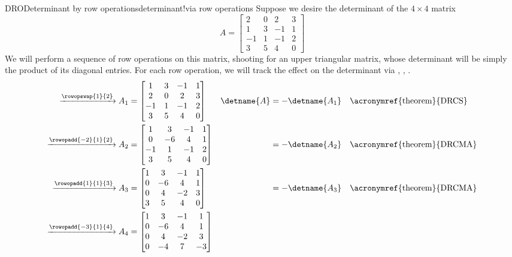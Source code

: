 \begin{example}{DRO}{Determinant by row operations}{determinant!via row operations}
Suppose we desire the determinant of the $4\times 4$ matrix
%
\begin{equation*}
A=
\begin{bmatrix}
2 & 0 & 2 & 3 \\
1 & 3 &-1 & 1 \\
-1& 1 &-1 & 2 \\
3 & 5 & 4 & 0 
\end{bmatrix}
\end{equation*}
%
We will perform a sequence of row operations on this matrix, shooting for an upper triangular matrix, whose determinant will be simply the product of its diagonal entries.  For each row operation, we will track the effect on the determinant via , , .
%
\begin{align*}
\xrightarrow{\rowopswap{1}{2}}
A_1&=
\begin{bmatrix}
1 & 3 &-1 & 1 \\
2 & 0 & 2 & 3 \\
-1& 1 &-1 & 2 \\
3 & 5 & 4 & 0 
\end{bmatrix}
&
\detname{A}&=-\detname{A_1}&&\text{\acronymref{theorem}{DRCS}}\\
\xrightarrow{\rowopadd{-2}{1}{2}}
A_2&=
\begin{bmatrix}
1 & 3 &-1 & 1 \\
0 &-6 & 4 & 1 \\
-1& 1 &-1 & 2 \\
3 & 5 & 4 & 0 
\end{bmatrix}
&
&=-\detname{A_2}&&\text{\acronymref{theorem}{DRCMA}}\\
\xrightarrow{\rowopadd{1}{1}{3}}
A_3&=
\begin{bmatrix}
1 & 3 &-1 & 1 \\
0 &-6 & 4 & 1 \\
0 & 4 &-2 & 3 \\
3 & 5 & 4 & 0 
\end{bmatrix}
&
&=-\detname{A_3}&&\text{\acronymref{theorem}{DRCMA}}\\
\xrightarrow{\rowopadd{-3}{1}{4}}
A_4&=
\begin{bmatrix}
1 & 3 &-1 & 1 \\
0 &-6 & 4 & 1 \\
0 & 4 &-2 & 3 \\
0 &-4 & 7 &-3 
\end{bmatrix}

\end{align*}
\end{example}
